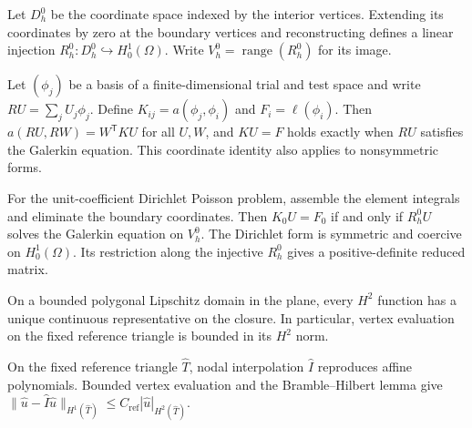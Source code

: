 \begin{proposition}
  \label{prop:p1-dirichlet-reconstruction}
  \notready
  Let $D_h^0$ be the coordinate space indexed by the interior vertices.
  Extending its coordinates by zero at the boundary vertices and reconstructing
  defines a linear injection $R_h^0:D_h^0\hookrightarrow H_0^1(\Omega)$.
  Write $V_h^0=\operatorname{range}(R_h^0)$ for its image.
\end{proposition}

\begin{proposition}
  \label{prop:galerkin-coordinates}
  \notready
  Let $(\phi_j)$ be a basis of a finite-dimensional trial and test space and
  write $RU=\sum_j U_j\phi_j$. Define $K_{ij}=a(\phi_j,\phi_i)$ and
  $F_i=\ell(\phi_i)$. Then $a(RU,RW)=W^{\mathsf T}KU$ for all $U,W$, and
  $KU=F$ holds exactly when $RU$ satisfies the Galerkin equation. This
  coordinate identity also applies to nonsymmetric forms.
\end{proposition}

\begin{proposition}
  \label{prop:poisson-reduced-system}
  \notready
  For the unit-coefficient Dirichlet Poisson problem, assemble the element
  integrals and eliminate the boundary coordinates. Then $K_0 U=F_0$ if and
  only if $R_h^0 U$ solves the Galerkin equation on $V_h^0$. The Dirichlet
  form is symmetric and coercive on $H_0^1(\Omega)$. Its restriction along
  the injective $R_h^0$ gives a positive-definite reduced matrix.
\end{proposition}

\begin{lemma}
  \label{lem:h2-nodal-values}
  \notready
  On a bounded polygonal Lipschitz domain in the plane, every $H^2$ function
  has a unique continuous representative on the closure. In particular,
  vertex evaluation on the fixed reference triangle is bounded in its $H^2$ norm.
\end{lemma}

\begin{lemma}
  \label{lem:p1-reference-bramble-hilbert}
  \notready
  On the fixed reference triangle $\widehat T$, nodal interpolation $\widehat I$
  reproduces affine polynomials. Bounded vertex evaluation and the Bramble--Hilbert
  lemma give $\|\widehat u-\widehat I\widehat u\|_{H^1(\widehat T)}
  \le C_{\mathrm{ref}}|\widehat u|_{H^2(\widehat T)}$.
\end{lemma}

